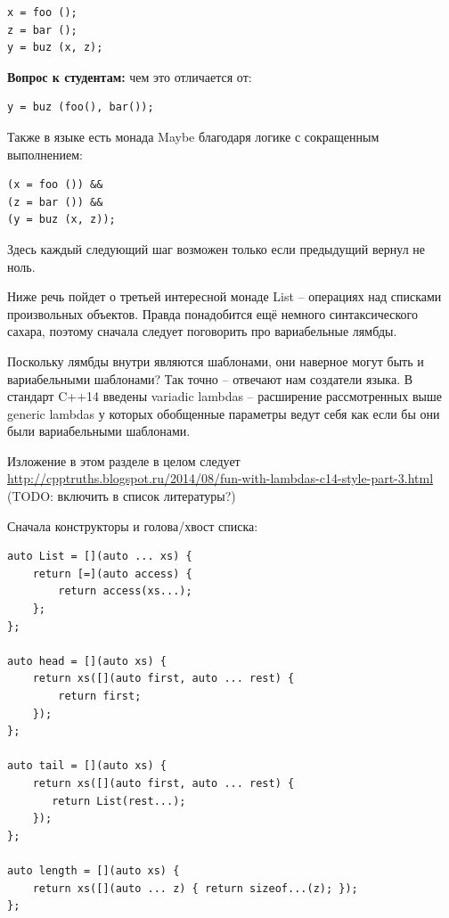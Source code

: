 \documentclass[a4paper,12pt,oneside]{article}
\newif\ifanswers
\begin{document}
\begin{lstlisting}
x = foo ();
z = bar ();
y = buz (x, z);
\end{lstlisting}

\textbf{Вопрос к студентам:} чем это отличается от:

\begin{lstlisting}
y = buz (foo(), bar());
\end{lstlisting}

\ifanswers
Правильный ответ: задана последовательность выполнения функций \lstinline!foo! и \lstinline!bar! 
\fi

Также в языке есть монада Maybe благодаря логике с сокращенным выполнением:

\begin{lstlisting}
(x = foo ()) &&
(z = bar ()) &&
(y = buz (x, z));
\end{lstlisting}

Здесь каждый следующий шаг возможен только если предыдущий вернул не ноль.

Ниже речь пойдет о третьей интересной монаде List -- операциях над списками произвольных объектов. Правда понадобится ещё немного синтаксического сахара, поэтому сначала следует поговорить про вариабельные лямбды.

Поскольку лямбды внутри являются шаблонами, они наверное могут быть и вариабельными шаблонами? Так точно -- отвечают нам создатели языка. В стандарт C++14 введены variadic lambdas -- расширение рассмотренных выше generic lambdas у которых обобщенные параметры ведут себя как если бы они были вариабельными шаблонами.

Изложение в этом разделе в целом следует \url{http://cpptruths.blogspot.ru/2014/08/fun-with-lambdas-c14-style-part-3.html} (TODO: включить в список литературы?)

Сначала конструкторы и голова/хвост списка:

\begin{lstlisting}
auto List = [](auto ... xs) {
    return [=](auto access) { 
        return access(xs...); 
    };
};

auto head = [](auto xs) {
    return xs([](auto first, auto ... rest) { 
        return first; 
    });
};

auto tail = [](auto xs) {
    return xs([](auto first, auto ... rest) { 
       return List(rest...); 
    });
};

auto length = [](auto xs) {
    return xs([](auto ... z) { return sizeof...(z); });
};
\end{lstlisting}
\end{document}
